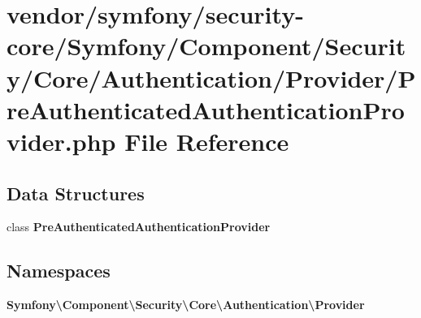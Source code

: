 \section{vendor/symfony/security-\/core/\+Symfony/\+Component/\+Security/\+Core/\+Authentication/\+Provider/\+Pre\+Authenticated\+Authentication\+Provider.php File Reference}
\label{_pre_authenticated_authentication_provider_8php}
\subsection*{Data Structures}
\begin{DoxyCompactItemize}
\item 
class {\bf Pre\+Authenticated\+Authentication\+Provider}
\end{DoxyCompactItemize}
\subsection*{Namespaces}
\begin{DoxyCompactItemize}
\item 
 {\bf Symfony\textbackslash{}\+Component\textbackslash{}\+Security\textbackslash{}\+Core\textbackslash{}\+Authentication\textbackslash{}\+Provider}
\end{DoxyCompactItemize}
